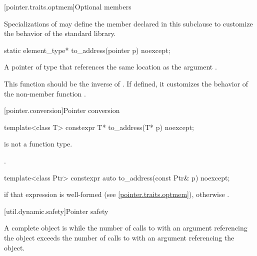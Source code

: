 [pointer.traits.optmem]{Optional members}

\pnum
Specializations of  may define the member declared
in this subclause to customize the behavior of the standard library.

%
\begin{itemdecl}
static element_type* to_address(pointer p) noexcept;
\end{itemdecl}

\begin{itemdescr}
\pnum
\returns
A pointer of type  that references
the same location as the argument .

\pnum
\begin{note}
This function should be the inverse of .
If defined, it customizes the behavior of
the non-member function
.
\end{note}
\end{itemdescr}

[pointer.conversion]{Pointer conversion}

%
\begin{itemdecl}
template<class T> constexpr T* to_address(T* p) noexcept;
\end{itemdecl}

\begin{itemdescr}
\pnum
\mandates
{} is not a function type.

\pnum
\returns
{}.
\end{itemdescr}

%
\begin{itemdecl}
template<class Ptr> constexpr auto to_address(const Ptr& p) noexcept;
\end{itemdecl}

\begin{itemdescr}
\pnum
\returns
{} if that expression is well-formed
(see \ref{pointer.traits.optmem}),
otherwise .
\end{itemdescr}

[util.dynamic.safety]{Pointer safety}

\pnum
A complete object is  while the number of calls to
 with an argument referencing the object exceeds the
number of calls to  with an argument referencing the
object.

